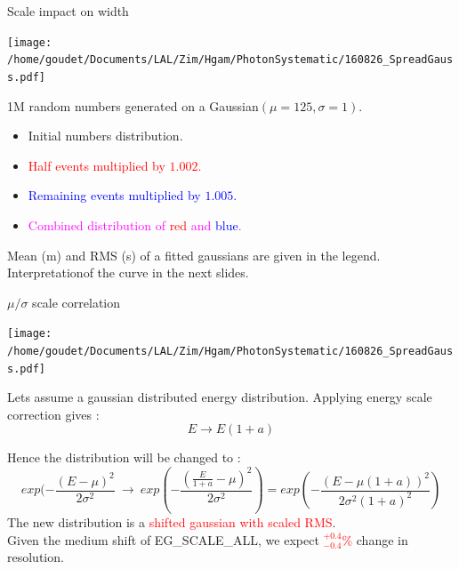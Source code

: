 \begin{frame}{Scale impact on width}
  \begin{minipage}{0.49\linewidth}\texttt{[image: /home/goudet/Documents/LAL/Zim/Hgam/PhotonSystematic/160826\_SpreadGauss.pdf]}\end{minipage}
  \hfill
  \begin{minipage}{0.49\linewidth}
    1M random numbers generated on a Gaussian$(\mu=125, \sigma=1)$.
    \begin{itemize}
    \item Initial numbers distribution.
    \item \textcolor{red}{Half events multiplied by $1.002$.}
    \item \textcolor{blue}{Remaining  events multiplied by $1.005$.}
    \item \textcolor{magenta}{Combined distribution of \textcolor{red}{red} and \textcolor{blue}{blue}.}
    \end{itemize}
  \end{minipage}
  \vfill
  Mean (m) and RMS (s) of a fitted gaussians are given in the legend.
  Interpretationof the curve in the next slides.
\end{frame}

\begin{frame}{$\mu /\sigma$ scale correlation}
  \begin{minipage}{0.49\linewidth}\texttt{[image: /home/goudet/Documents/LAL/Zim/Hgam/PhotonSystematic/160826\_SpreadGauss.pdf]}\end{minipage}
  \hfill
  \begin{minipage}{0.49\linewidth}
    Lets assume a gaussian distributed energy distribution.
    Applying energy scale correction gives : $$E\rightarrow E(1+a)$$

  \end{minipage}
      Hence the distribution will be changed to  :
      \begin{equation}
      exp( -\frac{(E-\mu)^2}{2\sigma^2}\
      \rightarrow\
      exp( -\frac{(\frac{E}{1+a}-\mu)^2}{2\sigma^2})
      =
      exp( -\frac{(E-\mu(1+a))^2}{2\sigma^2(1+a)^2})
    \end{equation}
      The new distribution is a \textcolor{red}{shifted gaussian with scaled RMS}.\\
      Given the medium shift of EG\_SCALE\_ALL, we expect \textcolor{red}{$^{+0.4}_{-0.4}\%$} change in resolution.
\end{frame}


